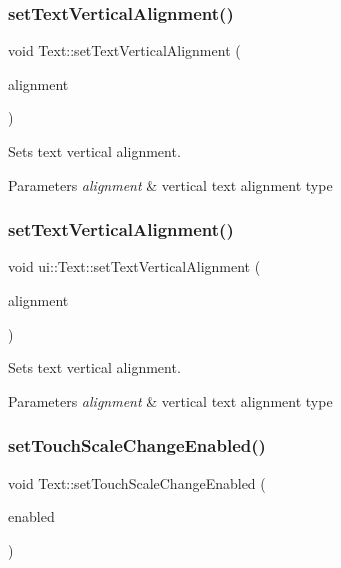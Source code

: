 \subsubsection{\texorpdfstring{set\+Text\+Vertical\+Alignment()}{setTextVerticalAlignment()}\hspace{0.1cm}{\footnotesize\ttfamily [1/2]}}
{\footnotesize\ttfamily void Text\+::set\+Text\+Vertical\+Alignment (\begin{DoxyParamCaption}\item[{Text\+V\+Alignment}]{alignment }\end{DoxyParamCaption})}

Sets text vertical alignment.


\begin{DoxyParams}{Parameters}
{\em alignment} & vertical text alignment type \\
\hline
\end{DoxyParams}
\mbox{\label{classui_1_1Text_aad364f6da62bcbaf2c108bdb8e4a91a4}} 
\subsubsection{\texorpdfstring{set\+Text\+Vertical\+Alignment()}{setTextVerticalAlignment()}\hspace{0.1cm}{\footnotesize\ttfamily [2/2]}}
{\footnotesize\ttfamily void ui\+::\+Text\+::set\+Text\+Vertical\+Alignment (\begin{DoxyParamCaption}\item[{Text\+V\+Alignment}]{alignment }\end{DoxyParamCaption})}

Sets text vertical alignment.


\begin{DoxyParams}{Parameters}
{\em alignment} & vertical text alignment type \\
\hline
\end{DoxyParams}
\mbox{\label{classui_1_1Text_a4ba60954b699bfcae22d1882c7352348}} 
\subsubsection{\texorpdfstring{set\+Touch\+Scale\+Change\+Enabled()}{setTouchScaleChangeEnabled()}\hspace{0.1cm}{\footnotesize\ttfamily [1/2]}}
{\footnotesize\ttfamily void Text\+::set\+Touch\+Scale\+Change\+Enabled (\begin{DoxyParamCaption}\item[{bool}]{enabled }\end{DoxyParamCaption})}

